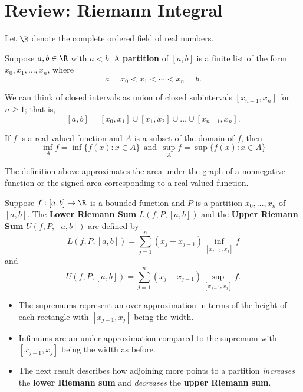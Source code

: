 \section{Review: Riemann Integral}

Let \( \R  \) denote the complete ordered field of real numbers.


\begin{definition}[Partition]
    Suppose \( a,b \in \R  \) with \( a <  b  \). A \textbf{partition} of \( [a,b] \) is a finite list of the form \( {x}_{0}, {x}_{1}, \dots, {x}_{n} \), where 
    \[  a = {x}_{0} < {x}_{1} < \cdots < {x}_{n} = b. \]
\end{definition}

We can think of closed intervals as union of closed subintervals \( [{x}_{n-1}, {x}_{n}] \) for \( n \geq  1  \); that is,
\[  [a,b] = [{x}_{0}, {x}_{1}] \cup [{x}_{1}, {x}_{2}] \cup \dots \cup [{x}_{n-1}, {x}_{n}]. \]

\begin{definition}
    If \( f \) is a real-valued function and \( A  \) is a subset of the domain of \( f \), then  
    \[ \inf_{A} f = \inf \{ f(x) : x \in A  \} \ \ \text{and} \ \ \sup_{A} f = \sup \{ f(x) : x \in A  \}  \]
\end{definition}

The definition above approximates the area under the graph of a nonnegative function or the signed area corresponding to a real-valued function.

\begin{definition}
    Suppose \( f: [a,b] \to \R  \) is a bounded function and \( P  \) is a partition \( {x}_{0}, \dots, {x}_{n} \) of \( [a,b] \). The \textbf{Lower Riemann Sum} \( L(f, P, [a,b]) \) and the \textbf{Upper Riemann Sum} \( U(f, P, [a,b]) \) are defined by 
    \[  L(f, P , [a,b] ) = \sum_{ j=1  }^{ n } ({x}_{j} - {x}_{j-1}) \inf_{[{x}_{j-1}, {x}_{j}]} f  \]
    and 
    \[  U(f, P, [a,b]) = \sum_{ j=1  }^{ n  }({x}_{j} - {x}_{j-1}) \sup_{[{x}_{j-1}, {x}_{j}]} f. \]
\end{definition}

\begin{itemize}
    \item The supremums represent an over approximation in terms of the height of each rectangle with \( [{x}_{j-1}, {x}_{j}] \) being the width. 
    \item Infimums are an under approximation compared to the supremum with \( [{x}_{j-1}, {x}_{j}] \) being the width as before.
    \item The next result describes how adjoining more points to a partition \textit{increases} the \textbf{lower Riemann sum} and \textit{decreases}  the \textbf{upper Riemann sum}.
\end{itemize}

